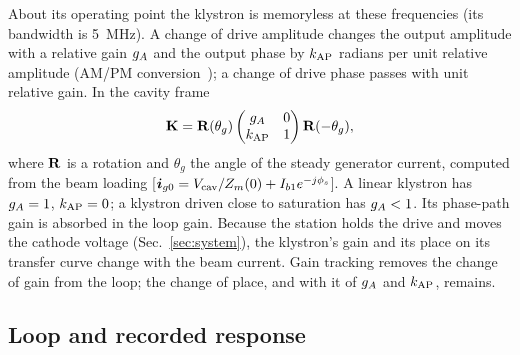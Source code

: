 About its operating point the klystron is memoryless at these frequencies (its bandwidth is \SI{5}{MHz}). A change of drive amplitude changes the output amplitude with a relative gain $g_A$ and the output phase by $k_\mathrm{AP}$ radians per unit relative amplitude (AM/PM conversion~\cite{Saleh1981,Cripps2006}); a change of drive phase passes with unit relative gain. In the cavity frame
\begin{equation}\label{eq:klystron}
\mathbf{K}=\mathbf{R}(\theta_g)\begin{pmatrix}g_A&0\\ k_\mathrm{AP}&1\end{pmatrix}\mathbf{R}(-\theta_g),
\end{equation}
where $\mathbf{R}$ is a rotation and $\theta_g$ the angle of the steady generator current, computed from the beam loading [$\bm{i}_{g0}=V_\mathrm{cav}/Z_m(0)+I_{b1}e^{-j\phi_s}$]. A linear klystron has $g_A=1$, $k_\mathrm{AP}=0$; a klystron driven close to saturation has $g_A<1$. Its phase-path gain is absorbed in the loop gain. Because the station holds the drive and moves the cathode voltage (Sec.~\ref{sec:system}), the klystron's gain and its place on its transfer curve change with the beam current. Gain tracking removes the change of gain from the loop; the change of place, and with it of $g_A$ and $k_\mathrm{AP}$, remains.

\subsection{Loop and recorded response}

